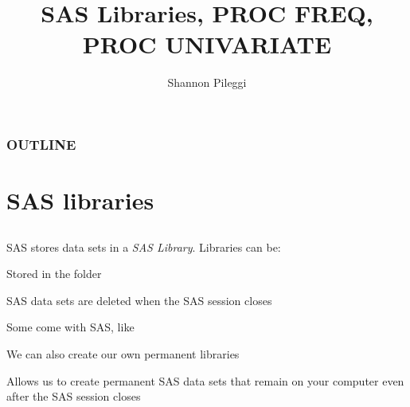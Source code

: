 




\title[Lecture 1]{SAS Libraries, PROC FREQ, PROC UNIVARIATE}
\author[Pileggi]{Shannon Pileggi}


\date{}




\begin{frame}
\titlepage
\end{frame}

\begin{frame}
\frametitle{OUTLINE\qquad\qquad\qquad} \tableofcontents[hideallsubsections]
\end{frame}


\section[SAS libraries]{SAS libraries}

\subsection{}

\begin{frame}
\end{frame}

\begin{frame}
SAS stores data sets in a \emph{SAS Library}.  Libraries can be:
\vskip10pt
\bi
\item Stored in the  folder
\item SAS data sets are deleted when the SAS session closes
\item[]
\ei
{}
\bi
\item Some come with SAS, like 
\item We can also create our own permanent libraries
\item Allows us to create permanent SAS data sets that remain on your computer even after the SAS session closes
\ei
\end{frame}

